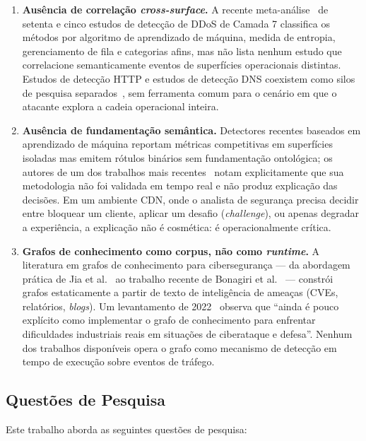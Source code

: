 \documentclass[preprint,12pt]{elsarticle}
\begin{document}
\begin{enumerate}
    \item \textbf{Ausência de correlação \emph{cross-surface}.} A recente meta-análise~\cite{odusami2020survey} de setenta e cinco estudos de detecção de DDoS de Camada 7 classifica os métodos por algoritmo de aprendizado de máquina, medida de entropia, gerenciamento de fila e categorias afins, mas não lista nenhum estudo que correlacione semanticamente eventos de superfícies operacionais distintas. Estudos de detecção HTTP e estudos de detecção DNS coexistem como silos de pesquisa separados~\cite{tripathi2021application}, sem ferramenta comum para o cenário em que o atacante explora a cadeia operacional inteira.
    \item \textbf{Ausência de fundamentação semântica.} Detectores recentes baseados em aprendizado de máquina reportam métricas competitivas em superfícies isoladas mas emitem rótulos binários sem fundamentação ontológica; os autores de um dos trabalhos mais recentes~\cite{kemp2023approach} notam explicitamente que sua metodologia não foi validada em tempo real e não produz explicação das decisões. Em um ambiente CDN, onde o analista de segurança precisa decidir entre bloquear um cliente, aplicar um desafio (\emph{challenge}), ou apenas degradar a experiência, a explicação não é cosmética: é operacionalmente crítica.
    \item \textbf{Grafos de conhecimento como corpus, não como \emph{runtime}.} A literatura em grafos de conhecimento para cibersegurança --- da abordagem prática de Jia et al.~\cite{jia2018practical} ao trabalho recente de Bonagiri et al.~\cite{bonagiri2024practical} --- constrói grafos estaticamente a partir de texto de inteligência de ameaças (CVEs, relatórios, \emph{blogs}). Um levantamento de 2022~\cite{liu2022recent} observa que ``ainda é pouco explícito como implementar o grafo de conhecimento para enfrentar dificuldades industriais reais em situações de ciberataque e defesa''. Nenhum dos trabalhos disponíveis opera o grafo como mecanismo de detecção em tempo de execução sobre eventos de tráfego.
\end{enumerate}

\subsection{Questões de Pesquisa}

Este trabalho aborda as seguintes questões de pesquisa:
\end{document}
